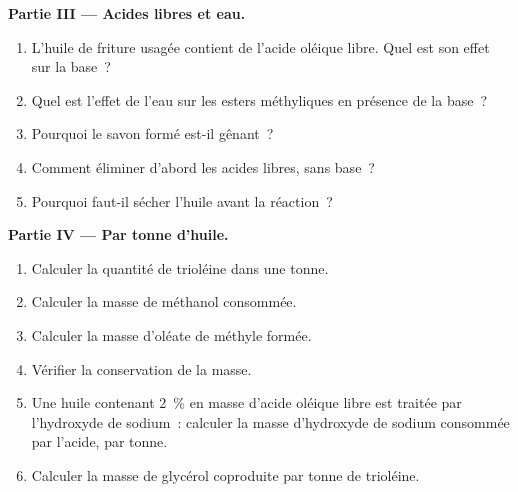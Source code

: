\begin{problem}
\medskip
\noindent\textbf{Partie III --- Acides libres et eau.}
\begin{enumerate}[resume]
  \item L'huile de friture usagée contient de l'acide oléique libre. Quel est son effet sur la base~?
  \item Quel est l'effet de l'eau sur les esters méthyliques en présence de la base~?
  \item Pourquoi le savon formé est-il gênant~?
  \item Comment éliminer d'abord les acides libres, sans base~?
  \item Pourquoi faut-il sécher l'huile avant la réaction~?
\end{enumerate}

\medskip
\noindent\textbf{Partie IV --- Par tonne d'huile.}
\begin{enumerate}[resume]
  \item Calculer la quantité de trioléine dans une tonne.
  \item Calculer la masse de méthanol consommée.
  \item Calculer la masse d'oléate de méthyle formée.
  \item Vérifier la conservation de la masse.
  \item Une huile contenant 2~\% en masse d'acide oléique libre est traitée par l'hydroxyde de sodium~:
        calculer la masse d'hydroxyde de sodium consommée par l'acide, par tonne.
  \item Calculer la masse de glycérol coproduite par tonne de trioléine.
\end{enumerate}
\end{problem}

